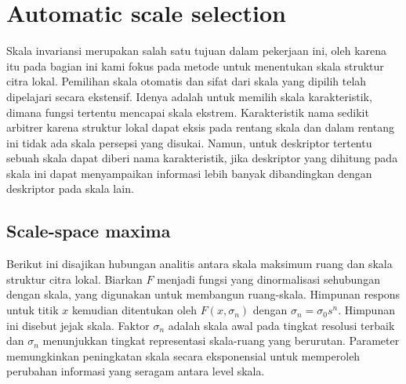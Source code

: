 \section{Automatic scale selection}
Skala invariansi merupakan salah satu tujuan dalam pekerjaan ini, oleh karena itu pada bagian ini kami fokus 
pada metode untuk menentukan skala struktur citra lokal. Pemilihan skala otomatis dan sifat dari skala yang 
dipilih telah dipelajari secara ekstensif. Idenya adalah untuk memilih skala karakteristik, 
dimana fungsi tertentu mencapai skala ekstrem. Karakteristik nama sedikit arbitrer karena struktur lokal 
dapat eksis pada rentang skala dan dalam rentang ini tidak ada skala persepsi yang disukai. 
Namun, untuk deskriptor tertentu sebuah skala dapat diberi nama karakteristik, jika deskriptor yang 
dihitung pada skala ini dapat menyampaikan informasi lebih banyak dibandingkan dengan deskriptor pada skala lain.

\subsection{Scale-space maxima}
Berikut ini disajikan hubungan analitis antara skala maksimum ruang dan skala struktur citra lokal. 
Biarkan \(F\) menjadi fungsi yang dinormalisasi sehubungan dengan skala, yang digunakan untuk membangun ruang-skala. 
Himpunan respons untuk titik \(x\) kemudian ditentukan oleh \(F(x,\sigma_{n})\) dengan \(\sigma_{n} =\sigma_{0}s^{n}\). 
Himpunan ini disebut jejak skala. Faktor \(\sigma_{n}\) adalah skala awal pada tingkat resolusi terbaik dan \(\sigma_{n}\) 
menunjukkan tingkat representasi skala-ruang yang berurutan. Parameter memungkinkan peningkatan skala secara eksponensial untuk memperoleh 
perubahan informasi yang seragam antara level skala.

